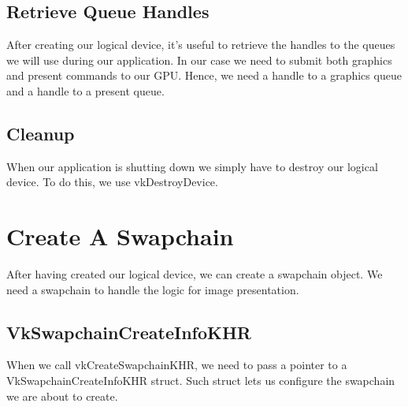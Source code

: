 \subsection{Retrieve Queue Handles}

After creating our logical device, it's useful to retrieve the handles to the
queues we will use during our application.
In our case we need to submit both graphics and present commands to our GPU.
Hence, we need a handle to a graphics queue and a handle to a present queue.

\begin{minipage}{\linewidth}{\noindent}
    
\end{minipage}

\subsection{Cleanup}

When our application is shutting down we simply have to destroy our logical
device.
To do this, we use vkDestroyDevice.

\section{Create A Swapchain}

After having created our logical device, we can create a swapchain object.
We need a swapchain to handle the logic for image presentation.

\begin{minipage}{\linewidth}{\noindent}
    
\end{minipage}

\subsection{VkSwapchainCreateInfoKHR}

When we call vkCreateSwapchainKHR, we need to pass a pointer to a
VkSwapchainCreateInfoKHR struct.
Such struct lets us configure the swapchain we are about to create.

\begin{minipage}{\linewidth}{\noindent}
    
\end{minipage}

